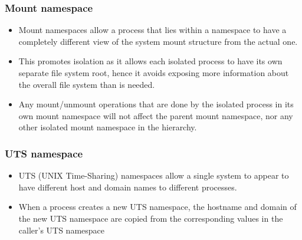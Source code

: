 \documentclass{article}
\begin{document}
\subsubsection{Mount namespace}
\begin{itemize}
    \item Mount namespaces allow a process that lies within a namespace to have a completely different view of the system mount structure from the actual one.
    
    \item This promotes isolation as it allows each isolated process to have its own separate file system root, hence it avoids exposing more information about the overall file system than is needed.
    
    \item Any mount/unmount operations that are done by the isolated process in its own mount namespace will not affect the parent mount namespace, nor any other isolated mount namespace in the hierarchy. 
\end{itemize}

\subsubsection{UTS namespace}
\begin{itemize}
    \item UTS (UNIX Time-Sharing) namespaces allow a single system to appear to have different host and domain names to different processes. 
    
    \item When a process creates a new UTS namespace, the hostname and domain of the new UTS namespace are copied from the corresponding values in the caller's UTS namespace
\end{itemize}
\end{document}
